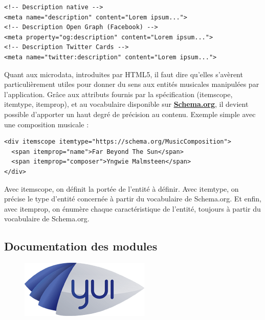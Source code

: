 \documentclass[a4paper,12pt]{article}
\begin{document}
\vspace{7pt}

\begin{lstlisting}
<!-- Description native -->
<meta name="description" content="Lorem ipsum...">
<!-- Description Open Graph (Facebook) -->
<meta property="og:description" content="Lorem ipsum...">
<!-- Description Twitter Cards -->
<meta name="twitter:description" content="Lorem ipsum...">
\end{lstlisting}

Quant aux microdata, introduites par HTML5, il faut dire qu'elles s'avèrent particulièrement utiles pour donner du sens aux entités musicales manipulées par l'application. Grâce aux attributs fournis par la spécification (itemscope, itemtype, itemprop), et au vocabulaire disponible sur \href{http://schema.org/docs/full.html}{\textbf{Schema.org}}, il devient possible d'apporter un haut degré de précision au contenu. Exemple simple avec une composition musicale :

\vspace{7pt}

\begin{lstlisting}
<div itemscope itemtype="https://schema.org/MusicComposition">
  <span itemprop="name">Far Beyond The Sun</span>
  <span itemprop="composer">Yngwie Malmsteen</span>
</div>
\end{lstlisting}

Avec itemscope, on définit la portée de l'entité à définir. Avec itemtype, on précise le type d'entité concernée à partir du vocabulaire de Schema.org. Et enfin, avec itemprop, on énumère chaque caractéristique de l'entité, toujours à partir du vocabulaire de Schema.org.

\newpage

\subsection{Documentation des modules}

\begin{figure}[!h]
  \begin{center}
    \includegraphics[scale=0.5]{logo-yuidoc.png}
  \end{center}
\end{figure}
\end{document}
